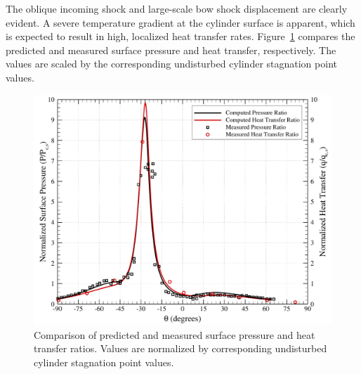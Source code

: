 The oblique incoming shock and large-scale bow shock displacement are clearly evident.  A severe temperature gradient at the cylinder surface is apparent, which is expected to result in high, localized heat transfer rates.  Figure~\ref{fig:onera_type4_ssi_p_q} compares the predicted and measured surface pressure and heat transfer, respectively.  The values are scaled by the corresponding undisturbed cylinder stagnation point values.
\begin{figure}[hbtp]
  \begin{center}
    \includegraphics[width=\textwidth]{figures/onera_type4_ssi/p_q_ratios}
    \caption[Comparison of predicted and measured surface pressure and heat transfer ratios.]{Comparison of predicted and measured surface pressure and heat transfer ratios. Values are normalized by corresponding undisturbed cylinder stagnation point values.\label{fig:onera_type4_ssi_p_q}}
  \end{center}
\end{figure}

